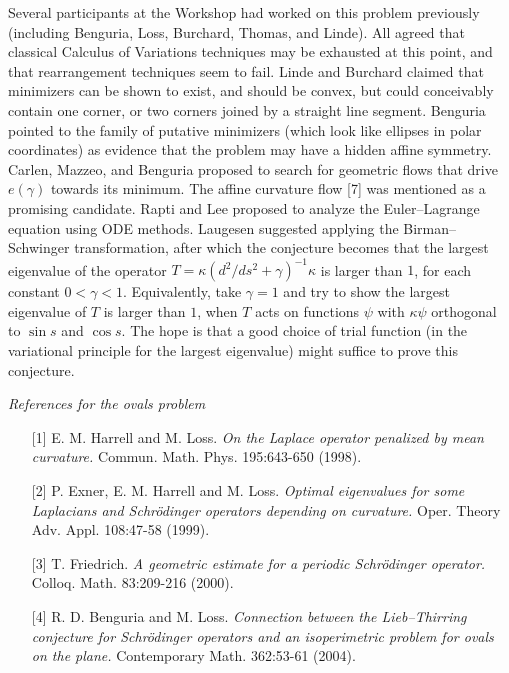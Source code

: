 \documentclass[12pt,letterpaper, reqno]{aimpl}
\begin{document}
\begin{problemblock}
\begin{remark}
Several participants at the Workshop had worked on this problem
previously (including Benguria, Loss, Burchard, Thomas, and Linde).
All agreed that classical Calculus of Variations techniques may be
exhausted at this point, and that rearrangement techniques seem to
fail. Linde and Burchard claimed that minimizers can be shown to
exist, and should be convex, but could conceivably contain one
corner, or two corners joined by a straight line segment.  Benguria
pointed to the family of putative minimizers (which look like
ellipses in polar coordinates) as evidence that the problem may have
a hidden affine symmetry. Carlen, Mazzeo, and Benguria proposed to
search for geometric flows that drive $e(\gamma)$ towards its
minimum. The affine curvature flow [7] was mentioned as a promising
candidate. Rapti and Lee proposed to analyze the Euler--Lagrange
equation using ODE methods. Laugesen suggested applying the
Birman--Schwinger transformation, after which the conjecture becomes
that the largest eigenvalue of the operator $T = \kappa (d^2/ds^2 +
\gamma)^{-1} \kappa$ is larger than $1$, for each constant
$0<\gamma<1$. Equivalently, take $\gamma=1$ and try to show the
largest eigenvalue of $T$ is larger than $1$, when $T$ acts on
functions $\psi$ with $\kappa \psi$ orthogonal to $\sin s$ and $\cos
s$. The hope is that a good choice of trial function (in the
variational principle for the largest eigenvalue) might suffice to
prove this conjecture.
\end{remark}

\begin{remark}

\emph{References for the ovals problem}

\begin{itemize}

\item[{[1]}] E. M. Harrell and M. Loss. \emph{On the Laplace operator
penalized by mean curvature.} Commun. Math. Phys. 195:643-650
(1998).

\item[{[2]}] P. Exner, E. M. Harrell and M. Loss. \emph{Optimal
eigenvalues  for some Laplacians and Schr\"odinger operators
depending on curvature.} Oper. Theory Adv. Appl. 108:47-58 (1999).

\item[{[3]}] T. Friedrich. \emph{A geometric estimate for
a periodic Schr\"odinger operator.} Colloq. Math. 83:209-216 (2000).

\item[{[4]}] R. D. Benguria and M. Loss. \emph{Connection between
the Lieb--Thirring conjecture for Schr\"o\-dinger operators and an
isoperimetric problem for ovals on the plane.} Contemporary Math.
362:53-61 (2004).


\end{itemize}
\end{remark}
\end{problemblock}
\end{document}
